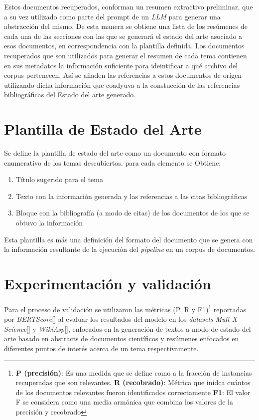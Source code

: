     Estos documentos recuperados, conforman un resumen extractivo preliminar, que a su vez utilizado como parte del prompt de un \emph{LLM} para generar una abstracción del mismo. De esta manera se obtiene una lista de los resúmenes de cada una de las secciones con las que se generará el estado del arte asociado a esos documentos, en correspondencia con la plantilla definida.
    Los documentos recuperados que son utilizados para generar el resumen de cada tema contienen en sus metadatos la información suficiente para ideintificar a qué archivo del corpus pertenecen. Así se añaden las referencias a estos documentos de origen utilizando dicha información que coadyuva a la constucción de las referencias bibliográficas del Estado del arte generado.


\section{Plantilla de Estado del Arte}
Se define la plantilla de estado del arte como un documento con formato enumerativo de los temas descubiertos. 
para cada elemento se Obtiene:
\begin{enumerate}
    \item Título sugerido para el tema
    \item Texto con la información generada y las referencias a las citas bibliográficas
    \item Bloque con la bibliografía (a modo de citas) de los documentos de los que se obtuvo la información
\end{enumerate}

Esta plantilla es más una definición del formato del documento que se genera con la información resultante de la ejecución del \emph{pipeline} en un corpus de documentos.

\section{Experimentación y validación}
Para el proceso de validación se utilizaron las m\'etricas (P, R y F1)\footnote{\textbf{P (precisión)}: Es una medida que se define como a la fracción de instancias recuperadas que son relevantes. \textbf{R (recobrado)}: M\'etrica que inidca cu\'antos de los documentos relevantes fueron identificados correctamente \textbf{F1}: El valor F se considera como una media armónica que combina los valores de la precisión y recobrado} reportadas por \emph{BERTScore}[\cite{bertscore}] al evaluar los resultados del modelo en los \emph{datasets} \emph{Mult-X-Science}[\cite{multixscience}] y \emph{WikiAsp}[\cite{wikiasp}], enfocados en la generación de textos a modo de estado del arte basado en abstracts de documentos científicos y resúmenes enfocados en diferentes puntos de interés acerca de un tema respectivamente.


